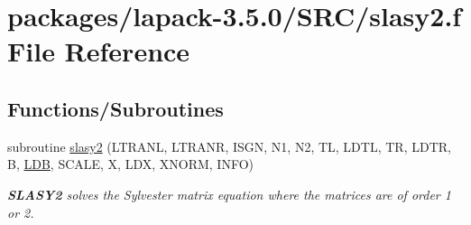 \hypertarget{slasy2_8f}{}\section{packages/lapack-\/3.5.0/\+S\+R\+C/slasy2.f File Reference}
\label{slasy2_8f}
\subsection*{Functions/\+Subroutines}
\begin{DoxyCompactItemize}
\item 
subroutine \hyperlink{group__realSYauxiliary_ga768b34b0d6fc6604ccf54437d5e8e78c}{slasy2} (L\+T\+R\+A\+N\+L, L\+T\+R\+A\+N\+R, I\+S\+G\+N, N1, N2, T\+L, L\+D\+T\+L, T\+R, L\+D\+T\+R, B, \hyperlink{example__user_8c_a50e90a7104df172b5a89a06c47fcca04}{L\+D\+B}, S\+C\+A\+L\+E, X, L\+D\+X, X\+N\+O\+R\+M, I\+N\+F\+O)
\begin{DoxyCompactList}\small\item\em {\bfseries S\+L\+A\+S\+Y2} solves the Sylvester matrix equation where the matrices are of order 1 or 2. \end{DoxyCompactList}\end{DoxyCompactItemize}
